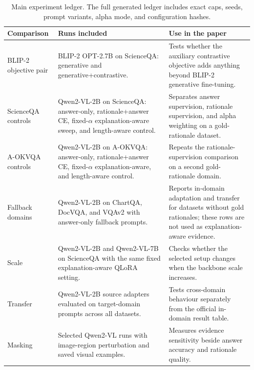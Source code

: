 \documentclass[preprint,12pt]{elsarticle}
\begin{document}
\begin{table}[!ht]
\centering
\caption{Main experiment ledger. The full generated ledger includes exact caps, seeds, prompt variants, alpha mode, and configuration hashes.}
\label{tab:ExperimentLedger}
\small
\renewcommand{\arraystretch}{1.15}
\begin{tabular}{|>{\raggedright\arraybackslash}p{}|>{\raggedright\arraybackslash}p{}|>{\raggedright\arraybackslash}p{}|}
\hline
\textbf{Comparison} & \textbf{Runs included} & \textbf{Use in the paper} \\ \hline
BLIP-2 objective pair & BLIP-2 OPT-2.7B on ScienceQA: generative and generative+contrastive. & Tests whether the auxiliary contrastive objective adds anything beyond BLIP-2 generative fine-tuning. \\
ScienceQA controls & Qwen2-VL-2B on ScienceQA: answer-only, rationale+answer CE, fixed-$\alpha$ explanation-aware sweep, and length-aware control. & Separates answer supervision, rationale supervision, and alpha weighting on a gold-rationale dataset. \\
A-OKVQA controls & Qwen2-VL-2B on A-OKVQA: answer-only, rationale+answer CE, fixed-$\alpha$ explanation-aware, and length-aware control. & Repeats the rationale-supervision comparison on a second gold-rationale domain. \\
Fallback domains & Qwen2-VL-2B on ChartQA, DocVQA, and VQAv2 with answer-only fallback prompts. & Reports in-domain adaptation and transfer for datasets without gold rationales; these rows are not used as explanation-aware evidence. \\
Scale & Qwen2-VL-2B and Qwen2-VL-7B on ScienceQA with the same fixed explanation-aware QLoRA setting. & Checks whether the selected setup changes when the backbone scale increases. \\
Transfer & Qwen2-VL-2B source adapters evaluated on target-domain prompts across all datasets. & Tests cross-domain behaviour separately from the official in-domain result table. \\
Masking & Selected Qwen2-VL runs with image-region perturbation and saved visual examples. & Measures evidence sensitivity beside answer accuracy and rationale quality. \\ \hline
\end{tabular}
\end{table}

\FloatBarrier
\end{document}
